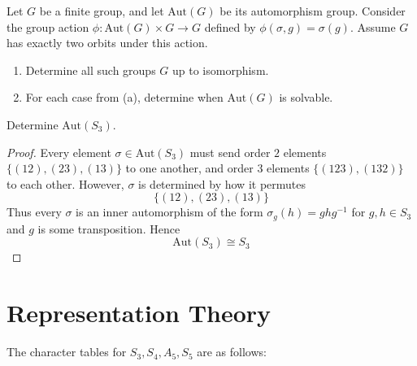 \begin{prob}[F2009-Q1]
    Let \( G \) be a finite group, and let \( \mathrm{Aut}(G) \) be its automorphism group. Consider the group action \( \phi \colon \mathrm{Aut}(G) \times G \to G \) defined by \( \phi(\sigma, g) = \sigma(g) \). Assume \( G \) has exactly two orbits under this action.
    
    \begin{enumerate}
        \item Determine all such groups \( G \) up to isomorphism.
        
        \item For each case from (a), determine when \( \mathrm{Aut}(G) \) is solvable.
    \end{enumerate}
\end{prob}

\begin{prob}[F2016-Q1]
    Determine $\text{Aut}(S_3)$.
\end{prob}
\begin{proof}
    Every element $\sigma\in\text{Aut}(S_3)$ must send order $2$ elements $\{(12), (23), (13)\}$ to one another, and order $3$ elements $\{(123), (132)\}$ to each other. However, $\sigma$ is determined by how it permutes 
    \begin{equation*}
        \{(12), (23), (13)\}
    \end{equation*}
    Thus every $\sigma$ is an inner automorphism of the form $\sigma_g(h)=ghg^{-1}$ for $g,h\in S_3$ and $g$ is some transposition. Hence 
    \begin{equation*}
        \text{Aut}(S_3)\cong S_3
    \end{equation*}
\end{proof}


\chapter{Representation Theory}


\begin{thm}

\end{thm}

\begin{lem}
    
\end{lem}

\begin{prop}
    
\end{prop}
\begin{prop}
    The character tables for $S_3, S_4, A_5, S_5$ are as follows:
\end{prop}


